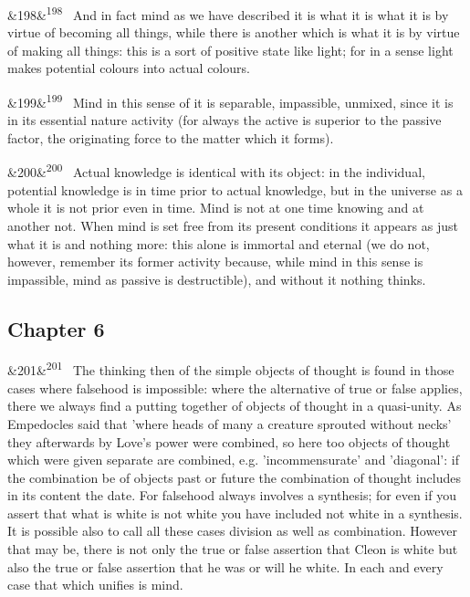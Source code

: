 \documentclass[12pt]{article}
\newcommand{\para}[1][]{\par\noindent\ifx&#1&\else\textsuperscript{\footnotesize #1}~\fi}
\begin{document}
\para[198] And in fact mind as we have described it is what it is what it is by virtue of becoming all things, while there is another which is what it is by virtue of making all things: this is a sort of positive state like light; for in a sense light makes potential colours into actual colours.

\para[199] Mind in this sense of it is separable, impassible, unmixed, since it is in its essential nature activity (for always the active is superior to the passive factor, the originating force to the matter which it forms).

\para[200] Actual knowledge is identical with its object: in the individual, potential knowledge is in time prior to actual knowledge, but in the universe as a whole it is not prior even in time. Mind is not at one time knowing and at another not. When mind is set free from its present conditions it appears as just what it is and nothing more: this alone is immortal and eternal (we do not, however, remember its former activity because, while mind in this sense is impassible, mind as passive is destructible), and without it nothing thinks.

\subsection*{Chapter 6}

\para[201] The thinking then of the simple objects of thought is found in those cases where falsehood is impossible: where the alternative of true or false applies, there we always find a putting together of objects of thought in a quasi-unity. As Empedocles said that 'where heads of many a creature sprouted without necks' they afterwards by Love's power were combined, so here too objects of thought which were given separate are combined, e.g. 'incommensurate' and 'diagonal': if the combination be of objects past or future the combination of thought includes in its content the date. For falsehood always involves a synthesis; for even if you assert that what is white is not white you have included not white in a synthesis. It is possible also to call all these cases division as well as combination. However that may be, there is not only the true or false assertion that Cleon is white but also the true or false assertion that he was or will he white. In each and every case that which unifies is mind.
\end{document}
